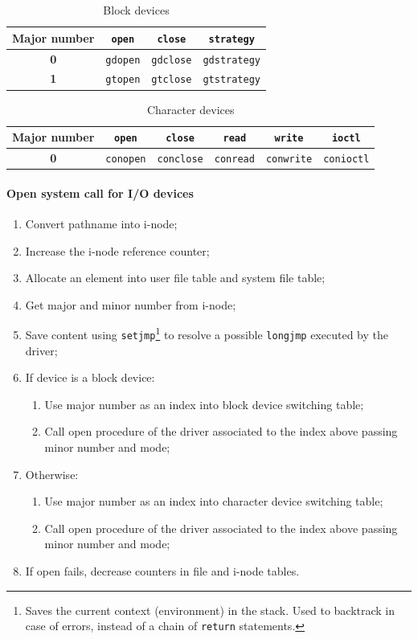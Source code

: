 \begin{table}[tb]
\centering
\begin{tabular}{|c|c|c|c|}
\hline
\textbf{Major number} & \texttt{open} & \texttt{close} & \texttt{strategy} \\
\hline
\textbf{0} & \texttt{gdopen} & \texttt{gdclose} & \texttt{gdstrategy} \\
\hline
\textbf{1} & \texttt{gtopen} & \texttt{gtclose} & \texttt{gtstrategy} \\
\hline
\end{tabular}
\caption{Block devices}
\label{tab:block_devices}
\end{table}

\begin{table}[tb]
\centering
\small
\begin{tabular}{|c|c|c|c|c|c|}
\hline
\textbf{Major number} & \texttt{open} & \texttt{close} & \texttt{read} & \texttt{write} & \texttt{ioctl} \\
\hline
\textbf{0} & \texttt{conopen} & \texttt{conclose} & \texttt{conread} & \texttt{conwrite} & \texttt{conioctl} \\
\hline
\end{tabular}
\caption{Character devices}
\label{tab:character_devices}
\end{table}

\paragraph{Open system call for I/O devices}
\begin{enumerate}
\item Convert pathname into i-node;
\item Increase the i-node reference counter;
\item Allocate an element into user file table and system file table;
\item Get major and minor number from i-node;
\item Save content using \texttt{setjmp}\footnote{Saves the current context (environment) in the stack. Used to backtrack in case of errors, instead of a chain of \texttt{return} statements.} to resolve a possible \texttt{longjmp} executed by the driver;
\item If device is a block device:
\begin{enumerate}
\item Use major number as an index into block device switching table;
\item Call open procedure of the driver associated to the index above passing minor number and mode;
\end{enumerate}
\item Otherwise:
\begin{enumerate}
\item Use major number as an index into character device switching table;
\item Call open procedure of the driver associated to the index above passing minor number and mode;
\end{enumerate}
\item If open fails, decrease counters in file and i-node tables.
\end{enumerate}

